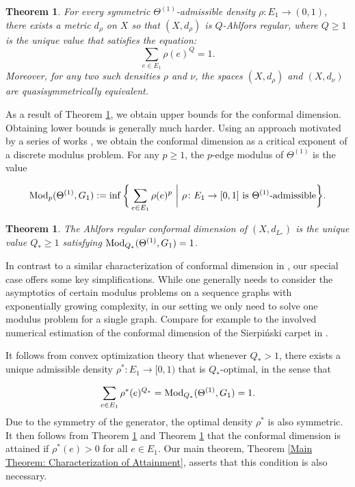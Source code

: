 \documentclass{amsart}
\newcommand{\Mod}{{\rm Mod}}
\newtheorem{theorem}[equation]{Theorem}
\numberwithin{equation}{section}
\theoremstyle{definition}
\theoremstyle{remark}
\begin{document}
\begin{theorem}\label{Main Theorem: Construction of Metrics}
    For every symmetric \(\Theta^{(1)}\)-admissible density \(\rho\colon E_1\to (0,1)\), there exists a metric \(d_\rho\) on \(X\) so that \((X,d_\rho)\) is \(Q\)-Ahlfors regular, where \(Q\geq 1\) is the unique value that satisfies the equation:
    \begin{equation}\label{eq:ARregexp}
        \sum_{e\in E_1}\rho(e)^Q=1.
    \end{equation}
    Moreover, for any two such densities \(\rho\) and \(\nu\), the spaces \((X,d_\rho)\) and \((X,d_\nu)\) are quasisymmetrically equivalent.
\end{theorem}

As a result of Theorem \ref{Main Theorem: Construction of Metrics}, we obtain upper bounds for the conformal dimension. Obtaining lower bounds is generally much harder. Using an approach motivated by a series of works \cite{P89,TQuasi,Tyson,KL,Carrasco}, we obtain the conformal dimension as a critical exponent of a discrete modulus problem.  For any \(p\geq 1\), the \(p\)-edge modulus of \(\Theta^{(1)}\) is the value
    
    \[
        \Mod_p(\Theta^{(1)},G_1):=\inf\bigg\{\sum_{e\in E_1}\rho(e)^p\ \bigg\vert\ \rho\colon E_1\to [0,1]\text{ is }\Theta^{(1)}\text{-admissible}\bigg\}.
    \]


    \begin{theorem}
    \label{Main Theorem: Value of Conformal Dimension}
    The Ahlfors regular conformal dimension of \((X,d_{L_*})\) is the unique value \(Q_*\geq 1\) satisfying \(\Mod_{Q_*}(\Theta^{(1)},G_1)=1\).
    \end{theorem}

In contrast to a similar characterization of conformal dimension in \cite{Carrasco}, our special case offers some key simplifications. While one generally needs to consider the asymptotics of certain modulus problems on a sequence graphs with exponentially growing complexity, in our setting we only need to solve one modulus problem for a single graph. Compare for example to the involved numerical estimation of the conformal dimension of the Sierpi\'nski carpet in \cite{Kwapisz}.

It follows from convex optimization theory that whenever \(Q_*>1\), there exists a unique admissible density \(\rho^*\colon E_1\to [0,1)\) that is \(Q_*\)-optimal, in the sense that

    \[
        \sum_{e\in E_1}\rho^*(e)^{Q_*}=\Mod_{Q_*}(\Theta^{(1)},G_1)=1.
    \]   
Due to the symmetry of the generator, the optimal density \(\rho^*\) is also symmetric. It then follows from Theorem \ref{Main Theorem: Construction of Metrics} and Theorem \ref{Main Theorem: Value of Conformal Dimension} that the conformal dimension is attained if \(\rho^*(e)>0\) for all \(e\in E_1\). Our main theorem, Theorem \ref{Main Theorem: Characterization of Attainment}, asserts that this condition is also necessary.
\end{document}
